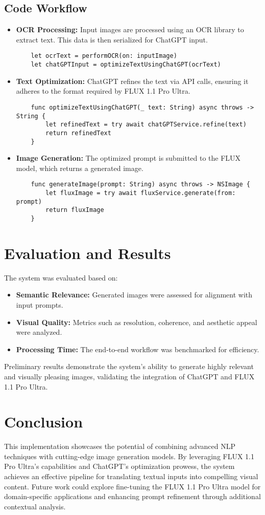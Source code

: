\subsection{Code Workflow}
\begin{itemize}
    \item \textbf{OCR Processing:} Input images are processed using an OCR library to extract text. This data is then serialized for ChatGPT input.
    \begin{verbatim}
    let ocrText = performOCR(on: inputImage)
    let chatGPTInput = optimizeTextUsingChatGPT(ocrText)
    \end{verbatim}
    \item \textbf{Text Optimization:} ChatGPT refines the text via API calls, ensuring it adheres to the format required by FLUX 1.1 Pro Ultra.
    \begin{verbatim}
    func optimizeTextUsingChatGPT(_ text: String) async throws -> String {
        let refinedText = try await chatGPTService.refine(text)
        return refinedText
    }
    \end{verbatim}
    \item \textbf{Image Generation:} The optimized prompt is submitted to the FLUX model, which returns a generated image.
    \begin{verbatim}
    func generateImage(prompt: String) async throws -> NSImage {
        let fluxImage = try await fluxService.generate(from: prompt)
        return fluxImage
    }
    \end{verbatim}
\end{itemize}

\section{Evaluation and Results}
The system was evaluated based on:
\begin{itemize}
    \item \textbf{Semantic Relevance:} Generated images were assessed for alignment with input prompts.
    \item \textbf{Visual Quality:} Metrics such as resolution, coherence, and aesthetic appeal were analyzed.
    \item \textbf{Processing Time:} The end-to-end workflow was benchmarked for efficiency.
\end{itemize}
Preliminary results demonstrate the system's ability to generate highly relevant and visually pleasing images, validating the integration of ChatGPT and FLUX 1.1 Pro Ultra.

\section{Conclusion}
This implementation showcases the potential of combining advanced NLP techniques with cutting-edge image generation models. By leveraging FLUX 1.1 Pro Ultra's capabilities and ChatGPT's optimization prowess, the system achieves an effective pipeline for translating textual inputs into compelling visual content. Future work could explore fine-tuning the FLUX 1.1 Pro Ultra model for domain-specific applications and enhancing prompt refinement through additional contextual analysis.